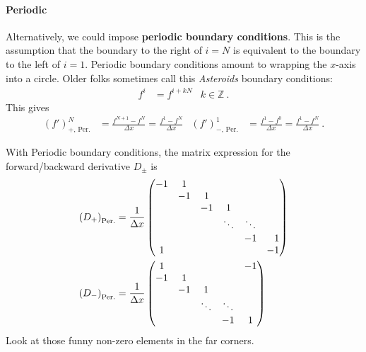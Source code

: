 \documentclass[12pt, oneside]{report}    %
\begin{document}
\paragraph{Periodic} Alternatively, we could  impose \textbf{periodic boundary conditions}. This is the assumption that the boundary to the right of $i=N$ is equivalent to the boundary to the left of $i=1$. Periodic boundary conditions amount to wrapping the $x$-axis into a circle. Older folks sometimes call this \emph{Asteroids} boundary conditions:
\begin{align}
  f^{i} &= f^{i+ kN}
  & k\in \mathbb{Z} \ .
\end{align}
This gives
\begin{align}
  (f')^N_\text{$+$, Per.} &= \frac{f^{N+1} - f^N}{\Delta x}
  = 
  \frac{f^1- f^N}{\Delta x}  
  &
 (f')^1_\text{$-$, Per.} &=\frac{f^{1} - f^0}{\Delta x} 
 = \frac{f^{1} - f^N}{\Delta x} 
  \ .
\end{align}
\begin{example}
With Periodic boundary conditions, the matrix expression for the forward/backward derivative $D_\pm$ is
\begin{align}
    \left(D_+\right)_\text{Per.}
    &=
    \frac{1}{\Delta x}
    \begin{pmatrix}
        -1 & 1 & & &  \\
        & -1 & 1 & &  \\
        & & -1 & 1 &  \\
        & & & \ddots & \ddots &  \\
        & & & & -1 & \pp 1 \\
        1 & & & & & -1 
    \end{pmatrix}
    \\
    \left(D_-\right)_\text{Per.}
    &=
    \frac{1}{\Delta x}
    \begin{pmatrix}
        1 & & & &  -1\\
         -1 & 1 & &  \\
        & -1 & 1 &  \\
         & & \ddots & \ddots &  \\
        & & & -1 &  1 
    \end{pmatrix}
\end{align}
Look at those funny non-zero elements in the far corners. 
\end{example}
\end{document}
